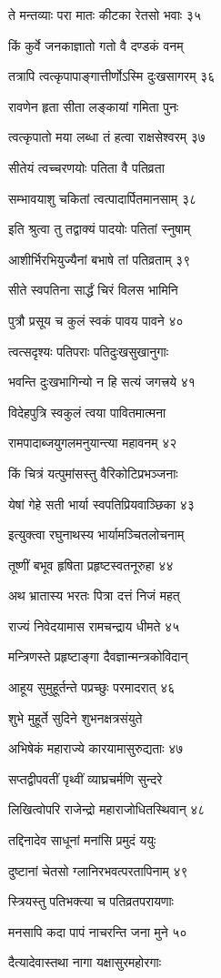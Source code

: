 ते मन्तव्याः परा मातः कीटका रेतसो भवाः ३५

किं कुर्वे जनकाज्ञातो गतो वै दण्डकं वनम्

तत्रापि त्वत्कृपापाङ्गात्तीर्णोऽस्मि दुःखसागरम् ३६

रावणेन हृता सीता लङ्कायां गमिता पुनः

त्वत्कृपातो मया लब्धा तं हत्वा राक्षसेश्वरम् ३७

सीतेयं त्वच्चरणयोः पतिता वै पतिव्रता

सम्भावयाशु चकितां त्वत्पादार्पितमानसाम् ३८

इति श्रुत्वा तु तद्वाक्यं पादयोः पतितां स्नुषाम्

आशीर्भिरभियुज्यैनां बभाषे तां पतिव्रताम् ३९

सीते स्वपतिना सार्द्धं चिरं विलस भामिनि

पुत्रौ प्रसूय च कुलं स्वकं पावय पावने ४०

त्वत्सदृश्यः पतिपराः पतिदुःखसुखानुगाः

भवन्ति दुःखभागिन्यो न हि सत्यं जगत्त्रये ४१

विदेहपुत्रि स्वकुलं त्वया पावितमात्मना

रामपादाब्जयुगलमनुयान्त्या महावनम् ४२

किं चित्रं यत्पुमांसस्तु वैरिकोटिप्रभञ्जनाः

येषां गेहे सती भार्या स्वपतिप्रियवाञ्छिका ४३

इत्युक्त्वा रघुनाथस्य भार्यामञ्चितलोचनाम्

तूष्णीं बभूव हृषिता प्रहृष्टस्वतनूरुहा ४४

अथ भ्रातास्य भरतः पित्रा दत्तं निजं महत्

राज्यं निवेदयामास रामचन्द्राय धीमते ४५

मन्त्रिणस्ते प्रहृष्टाङ्गा दैवज्ञान्मन्त्रकोविदान्

आहूय सुमुहूर्तन्ते पप्रच्छुः परमादरात् ४६

शुभे मुहूर्ते सुदिने शुभनक्षत्रसंयुते

अभिषेकं महाराज्ये कारयामासुरुद्यताः ४७

सप्तद्वीपवतीं पृथ्वीं व्याघ्रचर्मणि सुन्दरे

लिखित्वोपरि राजेन्द्रो महाराजोधितस्थिवान् ४८

तद्दिनादेव साधूनां मनांसि प्रमुदं ययुः

दुष्टानां चेतसो ग्लानिरभवत्परतापिनाम् ४९

स्त्रियस्तु पतिभक्त्या च पतिव्रतपरायणाः

मनसापि कदा पापं नाचरन्ति जना मुने ५०

दैत्यादेवास्तथा नागा यक्षासुरमहोरगाः

